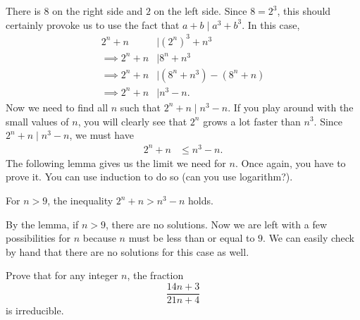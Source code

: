 \documentclass{subfile}
\begin{document}
		\begin{solution}
			There is $8$ on the right side and $2$ on the left side. Since $8=2^3$, this should certainly provoke us to use the fact that $a+b\mid a^3+b^3$. In this case,
				\begin{align*}
					2^n+n   & \mid (2^n)^3+n^3 \\
					\implies  2^n+n & \mid 8^n+n^3\\
					\implies 2^n+n	& \mid (8^n+n^3)-(8^n+n)\\
					\implies 2^n+n & \mid n^3-n.
				\end{align*}
			Now we need to find all $n$ such that $2^n+n\mid n^3-n$. If you play around with the small values of $n$, you will clearly see that $2^n$ grows a lot faster than $n^3$. Since $2^n+n\mid n^3-n$, we must have
				\begin{align*}
					2^n+n & \leq n^3-n.
				\end{align*}
			The following lemma gives us the limit we need for $n$. Once again, you have to prove it. You can use induction to do so (can you use logarithm?).
				\begin{lemma}
					For $n>9$, the inequality $2^n+n>n^3-n$ holds.
				\end{lemma}
			By the lemma, if $n>9$, there are no solutions. Now we are left with a few possibilities for $n$ because $n$ must be less than or equal to $9$. We can easily check by hand that there are no solutions for this case as well.
		\end{solution}

		\begin{problem}
			Prove that for any integer $n$, the fraction $$\dfrac{14n+3}{21n+4}$$ is irreducible.
		\end{problem}
\end{document}

